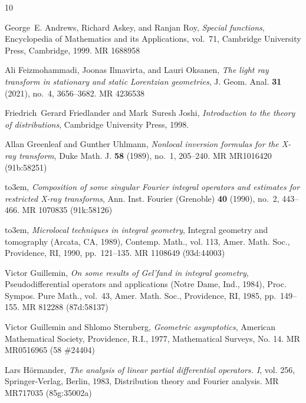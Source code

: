 \documentclass[11pt]{amsart}
\theoremstyle{definition}
\theoremstyle{remark}
\numberwithin{equation}{section}
\begin{document}
\providecommand{\bysame}{\leavevmode\hbox to3em{\hrulefill}\thinspace}
\providecommand{\MR}{\relax\ifhmode\unskip\space\fi MR }
\providecommand{\MRhref}[2]{%
  \href{http://www.ams.org/mathscinet-getitem?mr=#1}{#2}
}
\providecommand{\href}[2]{#2}
\begin{thebibliography}{10}

George~E. Andrews, Richard Askey, and Ranjan Roy, \emph{Special functions},
  Encyclopedia of Mathematics and its Applications, vol.~71, Cambridge
  University Press, Cambridge, 1999. \MR{1688958}

Ali Feizmohammadi, Joonas Ilmavirta, and Lauri Oksanen, \emph{The light ray
  transform in stationary and static {L}orentzian geometries}, J. Geom. Anal.
  \textbf{31} (2021), no.~4, 3656--3682. \MR{4236538}

Friedrich~Gerard Friedlander and Mark~Suresh Joshi, \emph{Introduction to the
  theory of distributions}, Cambridge University Press, 1998.

Allan Greenleaf and Gunther Uhlmann, \emph{Nonlocal inversion formulas for the
  {X}-ray transform}, Duke Math. J. \textbf{58} (1989), no.~1, 205--240.
  \MR{MR1016420 (91b:58251)}

\bysame, \emph{Composition of some singular {F}ourier integral operators and
  estimates for restricted {X}-ray transforms}, Ann. Inst. Fourier (Grenoble)
  \textbf{40} (1990), no.~2, 443--466. \MR{1070835 (91k:58126)}

\bysame, \emph{Microlocal techniques in integral geometry}, Integral geometry
  and tomography ({A}rcata, {CA}, 1989), Contemp. Math., vol. 113, Amer. Math.
  Soc., Providence, RI, 1990, pp.~121--135. \MR{1108649 (93d:44003)}

Victor Guillemin, \emph{On some results of {G}el'fand in integral geometry},
  Pseudodifferential operators and applications ({N}otre {D}ame, {I}nd., 1984),
  Proc. Sympos. Pure Math., vol.~43, Amer. Math. Soc., Providence, RI, 1985,
  pp.~149--155. \MR{812288 (87d:58137)}

Victor Guillemin and Shlomo Sternberg, \emph{Geometric asymptotics}, American
  Mathematical Society, Providence, R.I., 1977, Mathematical Surveys, No. 14.
  \MR{MR0516965 (58 \#24404)}

Lars H{\"o}rmander, \emph{The analysis of linear partial differential
  operators. {I}}, vol. 256, Springer-Verlag, Berlin, 1983, Distribution theory
  and Fourier analysis. \MR{MR717035 (85g:35002a)}


\end{thebibliography}
\end{document}
